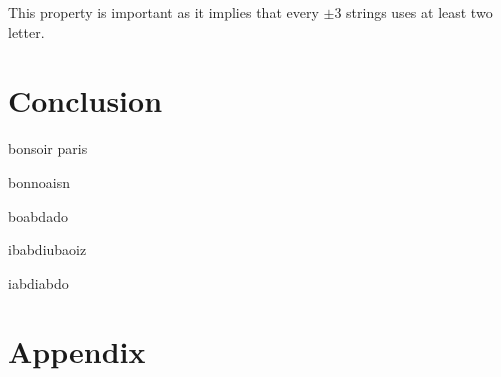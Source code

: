 \documentclass[11pt,a4paper]{article}
\theoremstyle{definition}
\theoremstyle{plain}
\theoremstyle{definition}
\begin{document}
This property is important as it implies that every $\pm 3$ strings uses at least two letter.


\newpage

\section{Conclusion}

bonsoir paris

bonnoaisn

boabdado

ibabdiubaoiz

iabdiabdo





\newpage

\section{Appendix}
\end{document}
